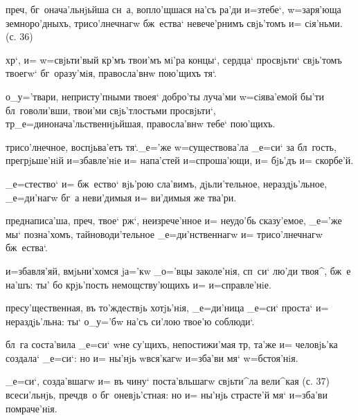 преч, бг~онача'льнjьйша сн~а, вопло'щшася на'съ 
ра'ди и=з\ъ тебе`, w=заря'юща земноро'дныхъ, 
трисо'лнечнагw бж~ества` невече'рнимъ свjь'томъ и= 
сiя'ньми. (с. 36)


хр`, и= w=свjьти'вый кр'мъ твои'мъ мi'ра концы`, 
сердца` просвjьти` свjь'томъ твоегw` бг~оразу'мiя, 
правосла'внw пою'щихъ тя`.

о_у='твари, непристу'пными твоея` добро'ты луча'ми 
w=сiява'емой бы'ти бл~говоли'вши, твои'ми свjь'тлостьми 
просвjьти`, тр _е=динонача'льственнjьйшая, 
правосла'внw тебе` пою'щихъ.

трисо'лнечное, воспjьва'етъ тя`._е='же w=существова'ла 
_е=си` за бл~гость, прегрjьше'нiй и=збавле'нiе и= 
напа'стей и=спроша'ющи, и= бjь'дъ и= скорбе'й.

_е=стество` и= бж~ество` вjь'рою сла'вимъ, дjьли'тельное, 
нераздjь'льное, _е=ди'нагw бг~а неви'димыя и= ви'димыя же 
тва'ри.

преднаписа'ша, преч, твое` рж`, неизрече'нное 
и= неудо'бь сказу'емое, _е='же мы` позна'хомъ, 
тайноводи'тельное _е=ди'нственнагw и= трисо'лнечнагw 
бж~ества`.


и=збавля'яй, вмjьни'хомся jа='кw _о='вцы заколе'нiя, 
сп~си` лю'ди твоя^, бж~е на'шъ: ты' бо крjь'пость 
немощству'ющихъ и= и=справле'нiе.

пресу'щественная, въ то'ждествjь хотjь'нiя, _е=ди'ница 
_е=си` проста` и= нераздjь'льна: ты` о_у='бw на'съ си'лою 
твое'ю соблюди`. %

бл~га соста'вила _е=си` w\т не су'щихъ, непостижи'мая 
тр, та'же и= человjь'ка создала` _е=си`: но и= ны'нjь 
w\т вся'кагw и=зба'ви мя` w=бстоя'нiя.

_е=си`, созда'вшагw и= въ чину` поста'вльшагw свjьти^ла 
вели^кая (с. 37) всеси'льнjь, преч дв~о 
бг~оневjь'стная: но и= ны'нjь страсте'й мя` и=зба'ви 
помраче'нiя.

